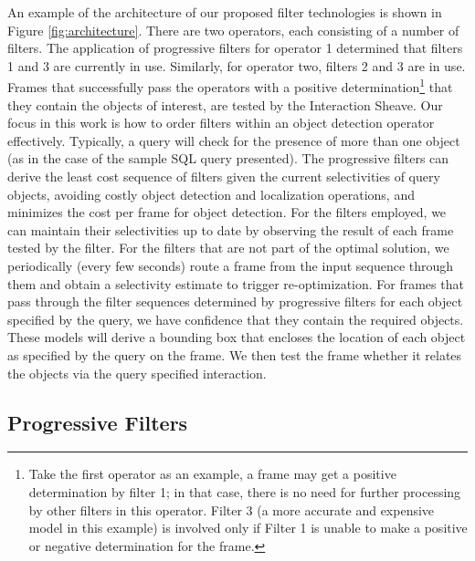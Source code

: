 \documentclass[sigconf]{acmart}
\begin{document}
An example of the architecture of our proposed filter technologies is shown in Figure \ref{fig:architecture}. There are two operators, each consisting of a number of filters. The application of progressive filters for operator 1 determined that filters 1 and 3 are currently in use. Similarly, for operator two, filters 2 and 3 are in use. Frames that successfully pass the operators with a positive determination\footnote{Take the first operator as an example, a frame may get a positive determination by filter 1; in that case, there is no need for further processing by other filters in this operator. Filter 3 (a more accurate and expensive model in this example) is involved only if Filter 1 is unable to make a positive or negative determination for the frame.} that they contain the objects of interest, are tested by the Interaction Sheave. 
Our focus in this work is how to order filters within an object detection operator effectively. Typically, a query will check for the presence of more than one object (as in the case of the sample SQL query presented). 
The progressive filters can derive the least cost sequence of filters given the current selectivities of query objects, avoiding costly object detection and localization operations, and minimizes the cost per frame for object detection. 
For the filters employed, we can maintain their selectivities up to date by observing the result of each frame tested by the filter. For the filters that are not part of the optimal solution, we periodically (every few seconds) route a frame from the input sequence through them and obtain a selectivity estimate to trigger re-optimization. 
For frames that pass through the filter sequences determined by progressive filters for each object specified by the query, we have confidence that they contain the required objects. These models will derive a bounding box that encloses the location of each object as specified by the query on the frame. We then test the frame whether it relates the objects via the query specified interaction. 

\subsection{Progressive Filters}
\label{sec:progressivefilters}
\end{document}
